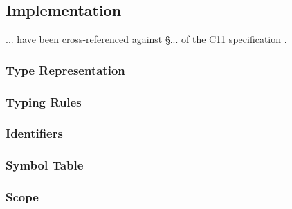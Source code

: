 \subsection{Implementation}
... have been cross-referenced against §... of the C11 specification \cite{c11_spec}.

\subsubsection{Type Representation}

\subsubsection{Typing Rules}

\subsubsection{Identifiers}

\subsubsection{Symbol Table}

\subsubsection{Scope}
